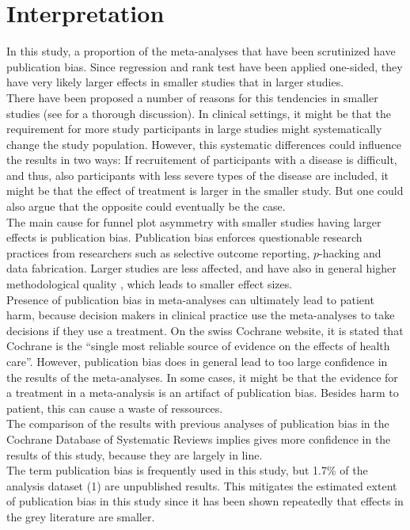 \documentclass[11pt,a4paper,twoside]{book}\usepackage[]{graphicx}\usepackage[]{color}
\begin{document}
\section{Interpretation}
In this study, a proportion of the meta-analyses that have been scrutinized have publication bias. Since regression and rank test have been applied one-sided, they have very likely larger effects in smaller studies that in larger studies. \\
There have been proposed a number of reasons for this tendencies in smaller studies (see \citet{Egger} for a thorough discussion). In clinical settings, it might be that the requirement for more study participants in large studies might systematically change the study population. However, this systematic differences could influence the results in two ways: If recruitement of participants with a disease is difficult, and thus, also participants with less severe types of the disease are included, it might be that the effect of treatment is larger in the smaller study. But one could also argue that the opposite could eventually be the case. \\
The main cause for funnel plot asymmetry with smaller studies having larger effects is publication bias. Publication bias enforces questionable research practices from researchers such as selective outcome reporting, $p$-hacking and data fabrication. Larger studies are less affected, and have also in general higher methodological quality \citep{Egger}, which leads to smaller effect sizes.\\
Presence of publication bias in meta-analyses can ultimately lead to patient harm, because decision makers in clinical practice use the meta-analyses to take decisions if they use a treatment. On the swiss Cochrane website, it is stated that Cochrane is the ``single most reliable source of evidence on the effects of health care''. However, publication bias does in general lead to too large confidence in the results of the meta-analyses. In some cases, it might be that the  evidence for a treatment in a meta-analysis is an artifact of publication bias. Besides harm to patient, this can cause a waste of ressources. \\
The comparison of the results with previous analyses of publication bias in the Cochrane Database of Systematic Reviews implies gives more confidence in the results of this study, because they are largely in line. \\
The term publication bias is frequently used in this study, but 1.7\% of the analysis dataset (1) are unpublished results. This mitigates the estimated extent of publication bias in this study since it has been shown repeatedly that effects in the grey literature are smaller.
\end{document}
